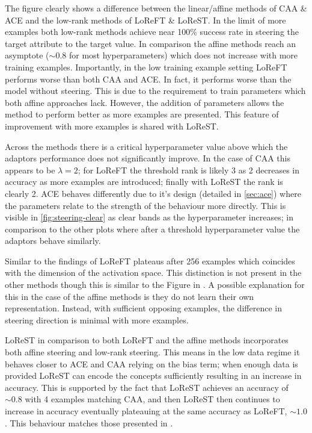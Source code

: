 The figure clearly shows a difference between the linear/affine methods of CAA \& ACE and the low-rank methods of LoReFT \& LoReST.
In the limit of more examples both low-rank methods achieve near 100\% success rate in steering the target attribute to the target value.
In comparison the affine methods reach an asymptote ($\sim 0.8$ for most hyperparameters) which does not increase with more training examples.
Importantly, in the low training example setting LoReFT performs worse than both CAA and ACE.
In fact, it performs worse than the model without steering.
This is due to the requirement to train parameters which both affine approaches lack.
However, the addition of parameters allows the method to perform better as more examples are presented.
This feature of improvement with more examples is shared with LoReST.

Across the methods there is a critical hyperparameter value above which the adaptors performance does not significantly improve.
In the case of CAA this appears to be $\lambda=2$; for LoReFT the threshold rank is likely 3 as 2 decreases in accuracy as more examples are introduced; finally with LoReST the rank is clearly 2.
ACE behaves differently due to it's design (detailed in \cref{sec:ace}) where the parameters relate to the strength of the behaviour more directly.
This is visible in \cref{fig:steering-clear} as clear bands as the hyperparameter increases; in comparison to the other plots where after a threshold hyperparameter value the adaptors behave similarly.

Similar to the findings of \citet{steering-clear} LoReFT plateaus after 256 examples which coincides with the dimension of the activation space.
This distinction is not present in the other methods though this is similar to the Figure in \citet{steering-clear}.
A possible explanation for this in the case of the affine methods is they do not learn their own representation.
Instead, with sufficient opposing examples, the difference in steering direction is minimal with more examples.

LoReST in comparison to both LoReFT and the affine methods incorporates both affine steering and low-rank steering.
This means in the low data regime it behaves closer to ACE and CAA relying on the bias term; when enough data is provided LoReST can encode the concepts sufficiently resulting in an increase in accuracy.
This is supported by the fact that LoReST achieves an accuracy of $\sim 0.8$ with 4 examples matching CAA, and then LoReST then continues to increase in accuracy eventually plateauing at the same accuracy as LoReFT, $\sim 1.0$.
This behaviour matches those presented in \citet{steering-clear}.

